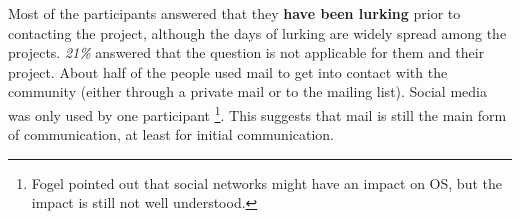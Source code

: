 Most of the participants answered that they {\bf have been lurking} prior to contacting the project, although the days of lurking are widely spread among the projects. {\it 21\%} answered that the question is not applicable for them and their project. 
About half of the people used mail to get into contact with the community (either through a private mail or to the mailing list). Social media was only used by one participant \footnote{Fogel pointed out that social networks might have an impact on OS, but the impact is still not well understood.}. This suggests that mail is still the main form of communication, at least for initial communication.